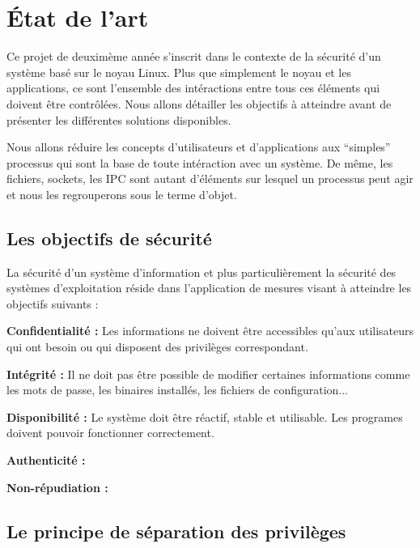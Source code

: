 \section{\'Etat de l'art}

Ce projet de deuximème année s'inscrit dans le contexte de la sécurité d'un système basé sur le noyau Linux. Plus que simplement le noyau et les applications, ce sont l'ensemble des intéractions entre tous ces éléments qui doivent être contrôlées. Nous allons détailler les objectifs à atteindre avant de présenter les différentes solutions disponibles. 


Nous allons réduire les concepts d'utilisateurs et d'applications aux ``simples'' processus qui sont la base de toute intéraction avec un système. De même, les fichiers, sockets, les IPC sont autant d'éléments sur lesquel un processus peut agir et nous les regrouperons sous le terme d'objet.

\subsection{Les objectifs de sécurité}

La sécurité d'un système d'information et plus particulièrement la sécurité des systèmes d'exploitation réside dans l'application de mesures visant à atteindre les objectifs suivants :

\textbf{Confidentialité :}
Les informations ne doivent être accessibles qu'aux utilisateurs qui ont besoin ou qui disposent des privilèges correspondant.

\textbf{Intégrité :}
Il ne doit pas être possible de modifier certaines informations comme les mots de passe, les binaires installés, les fichiers de configuration...

\textbf{Disponibilité :}
Le système doit être réactif, stable et utilisable. Les programes doivent pouvoir fonctionner correctement.

\textbf{Authenticité :}

\textbf{Non-répudiation :}

\subsection{Le principe de séparation des privilèges}


